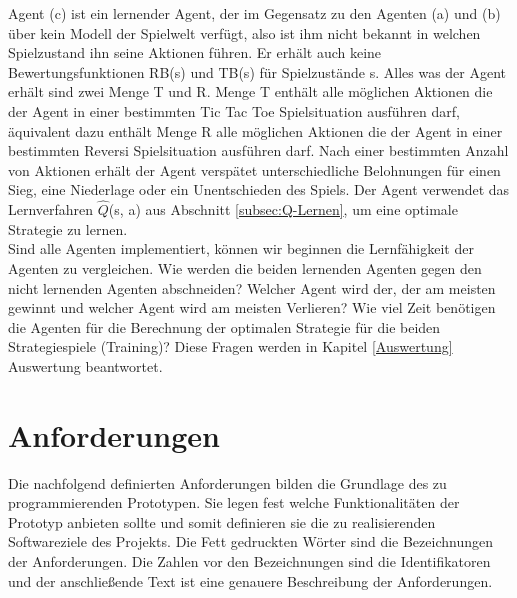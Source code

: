 Agent (c) ist ein lernender Agent, der im Gegensatz zu den Agenten (a) und (b) über kein Modell der Spielwelt verfügt, also ist ihm nicht bekannt in welchen Spielzustand ihn seine Aktionen führen. Er erhält auch keine Bewertungsfunktionen RB(s) und TB(s) für Spielzustände s. Alles was der Agent erhält sind zwei Menge T und R. Menge T enthält alle möglichen Aktionen die der Agent in einer bestimmten Tic Tac Toe Spielsituation ausführen darf, äquivalent dazu enthält Menge R alle möglichen Aktionen die der Agent in einer bestimmten Reversi Spielsituation ausführen darf. Nach einer bestimmten Anzahl von Aktionen erhält der Agent verspätet unterschiedliche Belohnungen für einen Sieg, eine Niederlage oder ein Unentschieden des Spiels. Der Agent verwendet das Lernverfahren $\hat{Q}$(s, a) aus Abschnitt  \ref{subsec:Q-Lernen}, um eine optimale Strategie zu lernen. \\

Sind alle Agenten implementiert, können wir beginnen die Lernfähigkeit der Agenten zu vergleichen. Wie werden die beiden lernenden Agenten gegen den nicht lernenden Agenten abschneiden? Welcher Agent wird der, der am meisten gewinnt und welcher Agent wird am meisten Verlieren? Wie viel Zeit benötigen die Agenten für die Berechnung der optimalen Strategie für die beiden Strategiespiele (Training)? Diese Fragen werden in Kapitel \ref{Auswertung} Auswertung beantwortet.

\section{Anforderungen}
\label{sec:Anforderungen}
Die nachfolgend definierten Anforderungen bilden die Grundlage des zu programmierenden Prototypen. Sie legen fest welche Funktionalitäten der Prototyp anbieten sollte und somit definieren sie die zu realisierenden Softwareziele des Projekts. Die Fett gedruckten Wörter sind die Bezeichnungen der Anforderungen. Die Zahlen vor den Bezeichnungen sind die Identifikatoren und der anschließende Text ist eine genauere Beschreibung der Anforderungen. \\


